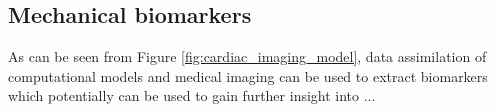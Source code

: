 




 






\subsection{Mechanical biomarkers}
As can be seen from Figure \ref{fig:cardiac_imaging_model}, data
assimilation of computational models and medical imaging can be used to
extract biomarkers which potentially can be used to gain further
insight into ...






